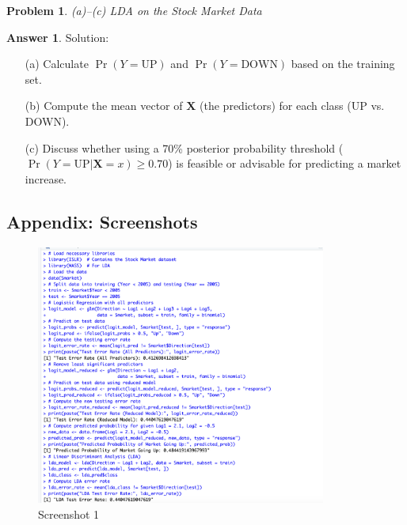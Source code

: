 \documentclass[12pt]{article}
\newtheorem{problem}{Problem} %
\theoremstyle{definition}
\newtheorem*{answer}{Answer}
\newcommand{\solution}{\textcolor{PineGreen}{Solution:\newline}}
\begin{document}
\setcounter{problem}{1}
\begin{problem}
\textbf{} (a)--(c) LDA on the Stock Market Data
\end{problem}

\begin{answer}
\solution
\begin{itemize}
    \item[(a)] Calculate \(\Pr(Y = \text{UP})\) and \(\Pr(Y = \text{DOWN})\) based on the training set.
    \item[(b)] Compute the mean vector of \(\mathbf{X}\) (the predictors) for each class (UP vs. DOWN).
    \item[(c)] Discuss whether using a 70\% posterior probability threshold (\(\Pr(Y=\text{UP}|\mathbf{X}=x) \ge 0.70\)) is feasible or advisable for predicting a market increase.
\end{itemize}
\end{answer}

\newpage

\subsection*{Appendix: Screenshots}

\begin{figure}[htbp]
    \centering
    \includegraphics[width=0.85\textwidth]{Screenshot_2025-03-02_at_3.56.05_PM.png}
    \caption{Screenshot 1}
    \label{fig:screenshot1}
\end{figure}
\end{document}
